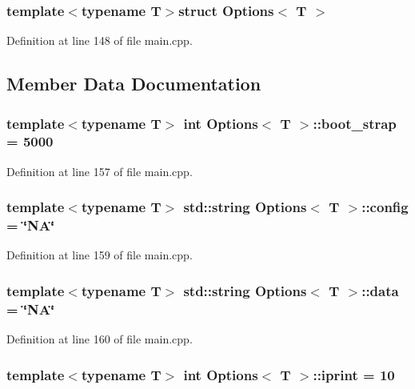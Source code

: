 \subsubsection*{template$<$typename T$>$struct Options$<$ T $>$}



Definition at line 148 of file main.\-cpp.



\subsection{Member Data Documentation}
\hypertarget{struct_options_a40e40c4cbdb83403f52dbecc0fe07749}{
\subsubsection[{boot\-\_\-strap}]{\setlength{\rightskip}{0pt plus 5cm}template$<$typename T$>$ int {\bf Options}$<$ T $>$\-::boot\-\_\-strap = 5000}}\label{struct_options_a40e40c4cbdb83403f52dbecc0fe07749}


Definition at line 157 of file main.\-cpp.

\hypertarget{struct_options_a1ac9c3e29359a31236632434946f379c}{
\subsubsection[{config}]{\setlength{\rightskip}{0pt plus 5cm}template$<$typename T$>$ std\-::string {\bf Options}$<$ T $>$\-::config = \char`\"{}N\-A\char`\"{}}}\label{struct_options_a1ac9c3e29359a31236632434946f379c}


Definition at line 159 of file main.\-cpp.

\hypertarget{struct_options_af07888a17b99d02ba62574edc34ccaee}{
\subsubsection[{data}]{\setlength{\rightskip}{0pt plus 5cm}template$<$typename T$>$ std\-::string {\bf Options}$<$ T $>$\-::data = \char`\"{}N\-A\char`\"{}}}\label{struct_options_af07888a17b99d02ba62574edc34ccaee}


Definition at line 160 of file main.\-cpp.

\hypertarget{struct_options_a65ca6536c995fd09207c19b26d6a657f}{
\subsubsection[{iprint}]{\setlength{\rightskip}{0pt plus 5cm}template$<$typename T$>$ int {\bf Options}$<$ T $>$\-::iprint = 10}}\label{struct_options_a65ca6536c995fd09207c19b26d6a657f}


